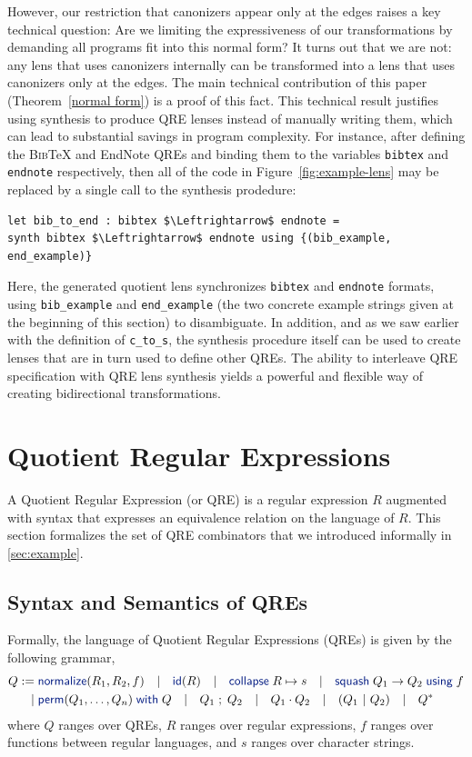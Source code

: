 \documentclass[acmsmall,review,anonymous]{acmart}
\newcommand{\kw}[1]{\textcolor{dkblue}{\ensuremath{\mathsf{#1}}}}
\newcommand{\collapse}[2]{\ensuremath{\kw{collapse} \; #1 \mapsto #2}}
\newcommand{\squash}[3]{\ensuremath{\kw{squash} \; #1 \rightarrow #2\; \kw{using} \; #3}}
\newcommand{\perm}[2]{\ensuremath{\kw{perm}(#1)\; \kw{with}\; #2}}
\newcommand{\normalize}[3]{\ensuremath{\kw{normalize}(#1, #2, #3)}}
\newcommand{\sep}{\ensuremath{\ | \ }}
\newcommand{\bibtex}{\textsc{Bib}\TeX{}}
\newcommand{\semicolon}{\ensuremath{\; ; \;}}
\newcommand{\id}{\ensuremath{\kw{id}}}
\newcommand{\bsep}{\ \ \sep{} \ \ }
\newcommand{\cd}[1]{\lstinline[backgroundcolor=\color{white}]$#1$}
\begin{document}
However, our restriction that canonizers appear only at the edges
raises a key technical question: Are we limiting the expressiveness of
our transformations by demanding all programs fit into this normal
form?  It turns out that we are not: any lens that uses canonizers
internally can be transformed into a lens that uses canonizers only at
the edges. The main technical contribution of this paper
(Theorem~\ref{normal form})
is a proof of this fact.
This technical result justifies 
using synthesis to produce QRE lenses instead of manually writing
them,
which can lead to substantial savings in program complexity.
For instance, after defining the \bibtex{} and EndNote QREs and
binding them to the variables \cd{bibtex} and \cd{endnote} respectively, then
all of the code in Figure~\ref{fig:example-lens} may be replaced by a single call
to the synthesis prodedure:
\begin{lstlisting}
let bib_to_end : bibtex $\Leftrightarrow$ endnote =
synth bibtex $\Leftrightarrow$ endnote using {(bib_example, end_example)}
\end{lstlisting}
\noindent 
Here, the generated quotient lens synchronizes \cd{bibtex} and
\cd{endnote} formats, using \cd{bib_example} and \cd{end_example} (the two
concrete example strings given at the beginning of this section) to
disambiguate. In addition, and as we saw earlier with the definition of
\cd{c_to_s}, the synthesis procedure itself can be used to create lenses that
are in turn used to define other QREs.  The ability to interleave QRE
specification with QRE lens synthesis yields a powerful and flexible way of
creating bidirectional transformations.

\section{Quotient Regular Expressions}
\label{QRE}
A Quotient Regular Expression (or QRE) is a regular expression $R$ augmented
with syntax that expresses an equivalence relation on the language of $R$. This
section formalizes the set of QRE combinators that we introduced informally
in \cref{sec:example}.

\subsection{Syntax and Semantics of QREs}
Formally, the language of Quotient Regular Expressions (QREs) is given by the
following grammar,
\begin{align*}
Q := \; & \normalize{R_1}{R_2}{f} \bsep{} \id(R) \bsep \collapse{R}{s} \bsep
\squash{Q_1}{Q_2}{f} \\ | \; & \perm{Q_1, \ldots, Q_n}{Q} \bsep Q_1 \semicolon
Q_2 \bsep Q_1 \cdot Q_2 \bsep (Q_1 \sep Q_2) \bsep Q^*
\end{align*}
where $Q$ ranges over QREs, 
$R$ ranges over regular expressions, 
$f$ ranges over functions between regular languages, and 
$s$ ranges over character strings.
\end{document}
